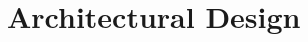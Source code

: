 \section{Architectural Design}




\clearpage


\clearpage


\clearpage


\clearpage


\clearpage


\clearpage